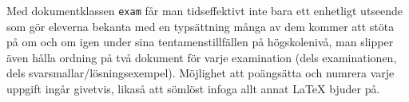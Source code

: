 Med dokumentklassen \verb?exam? får man tidseffektivt inte bara ett enhetligt utseende som gör eleverna bekanta med en typsättning många av dem kommer att stöta på om och om igen under sina tentamenstillfällen på högskolenivå, man slipper även hålla ordning på två dokument för varje examination (dels examinationen, dels svarsmallar/lösningsexempel). Möjlighet att poängsätta och numrera varje uppgift ingår givetvis, likaså att sömlöst infoga allt annat \LaTeX{} bjuder på.

